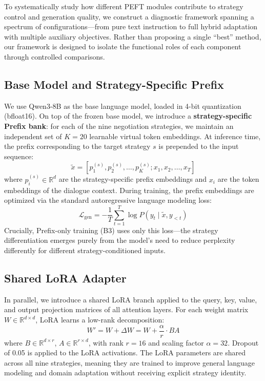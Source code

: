 \documentclass[conference]{IEEEtran}
\begin{document}
To systematically study how different PEFT modules contribute to strategy control and generation quality, we construct a diagnostic framework spanning a spectrum of configurations---from pure text instruction to full hybrid adaptation with multiple auxiliary objectives. Rather than proposing a single ``best'' method, our framework is designed to isolate the functional roles of each component through controlled comparisons.

\subsection{Base Model and Strategy-Specific Prefix}

We use Qwen3-8B as the base language model, loaded in 4-bit quantization (bfloat16). On top of the frozen base model, we introduce a \textbf{strategy-specific Prefix bank}: for each of the nine negotiation strategies, we maintain an independent set of $K = 20$ learnable virtual token embeddings. At inference time, the prefix corresponding to the target strategy $s$ is prepended to the input sequence:
\begin{equation}
\tilde{x} = [p_1^{(s)}, p_2^{(s)}, \ldots, p_K^{(s)}; x_1, x_2, \ldots, x_T]
\end{equation}
where $p_i^{(s)} \in \mathbb{R}^d$ are the strategy-specific prefix embeddings and $x_i$ are the token embeddings of the dialogue context. During training, the prefix embeddings are optimized via the standard autoregressive language modeling loss:
\begin{equation}
\mathcal{L}_{\text{gen}} = -\frac{1}{T} \sum_{t=1}^{T} \log P(y_t \mid \tilde{x}, y_{<t})
\end{equation}
Crucially, Prefix-only training (B3) uses only this loss---the strategy differentiation emerges purely from the model's need to reduce perplexity differently for different strategy-conditioned inputs.

\subsection{Shared LoRA Adapter}

In parallel, we introduce a shared LoRA branch applied to the query, key, value, and output projection matrices of all attention layers. For each weight matrix $W \in \mathbb{R}^{d \times d}$, LoRA learns a low-rank decomposition:
\begin{equation}
W' = W + \Delta W = W + \frac{\alpha}{r} \cdot BA
\end{equation}
where $B \in \mathbb{R}^{d \times r}$, $A \in \mathbb{R}^{r \times d}$, with rank $r = 16$ and scaling factor $\alpha = 32$. Dropout of 0.05 is applied to the LoRA activations. The LoRA parameters are shared across all nine strategies, meaning they are trained to improve general language modeling and domain adaptation without receiving explicit strategy identity.
\end{document}
